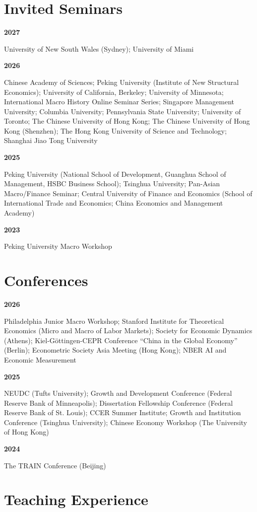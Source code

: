 \documentclass[10pt,letterpaper]{article}
\newcommand{\cvyear}[2]{%
    \par\addvspace{5pt}\noindent
    \begin{minipage}[t]{0.09\textwidth}\textbf{#1}\end{minipage}\hfill
    \begin{minipage}[t]{0.89\textwidth}\raggedright #2\end{minipage}\par}
\begin{document}
\newpage

\section*{Invited Seminars}
\cvyear{2027}{
University of New South Wales (Sydney);
University of Miami
}

\cvyear{2026}{
Chinese Academy of Sciences;
Peking University (Institute of New Structural Economics);
University of California, Berkeley;
University of Minnesota;
International Macro History Online Seminar Series;
Singapore Management University;
Columbia University;
Pennsylvania State University;
University of Toronto;
The Chinese University of Hong Kong;
The Chinese University of Hong Kong (Shenzhen);
The Hong Kong University of Science and Technology;
Shanghai Jiao Tong University}

\cvyear{2025}{
Peking University (National School of Development, Guanghua School of Management, HSBC Business School);
Tsinghua University;
Pan-Asian Macro/Finance Seminar;
Central University of Finance and Economics (School of International Trade and Economics; China Economics and Management Academy)}

\cvyear{2023}{Peking University Macro Workshop}


\section*{Conferences}

\cvyear{2026}{
Philadelphia Junior Macro Workshop;
Stanford Institute for Theoretical Economics (Micro and Macro of Labor Markets);
Society for Economic Dynamics (Athens);
Kiel-Göttingen-CEPR Conference ``China in the Global Economy'' (Berlin);
Econometric Society Asia Meeting (Hong Kong);
NBER AI and Economic Measurement}

\cvyear{2025}{
NEUDC (Tufts University);
Growth and Development Conference (Federal Reserve Bank of Minneapolis);
Dissertation Fellowship Conference (Federal Reserve Bank of St. Louis);
CCER Summer Institute;
Growth and Institution Conference (Tsinghua University);
Chinese Economy Workshop (The University of Hong Kong)}

\cvyear{2024}{The TRAIN Conference (Beijing)}

\section*{Teaching Experience}
\end{document}
